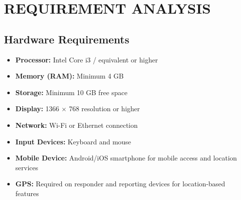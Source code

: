 \documentclass[a4paper,12pt]{report}
\begin{document}
	\chapter{REQUIREMENT ANALYSIS}
	
	\section{Hardware Requirements}
	\begin{itemize}
		\item \textbf{Processor:} Intel Core i3 / equivalent or higher
		\item \textbf{Memory (RAM):} Minimum 4 GB
		\item \textbf{Storage:} Minimum 10 GB free space
		\item \textbf{Display:} 1366 $\times$ 768 resolution or higher
		\item \textbf{Network:} Wi-Fi or Ethernet connection
		\item \textbf{Input Devices:} Keyboard and mouse
		\item \textbf{Mobile Device:} Android/iOS smartphone for mobile access and location services
		\item \textbf{GPS:} Required on responder and reporting devices for location-based features
	\end{itemize}
	
\end{document}
